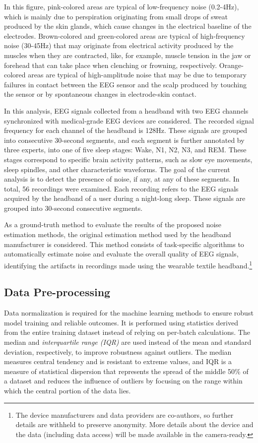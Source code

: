 \documentclass[conference]{IEEEtran}
\begin{document}
In this figure, pink-colored areas are typical of low-frequency noise (0.2-4Hz), which is mainly due to perspiration originating from small drops of sweat produced by the skin glands, which cause changes in the electrical baseline of the electrodes. Brown-colored and green-colored areas are typical of high-frequency noise (30-45Hz) that may originate from electrical activity produced by the muscles when they are contracted, like, for example, muscle tension in the jaw or forehead that can take place when clenching or frowning, respectively. Orange-colored areas are typical of high-amplitude noise that may be due to temporary failures in contact between the EEG sensor and the scalp produced by touching the sensor or by spontaneous changes in electrode-skin contact.

In this analysis, EEG signals collected from a headband with two EEG channels synchronized with medical-grade EEG devices are considered. The recorded signal frequency for each channel of the headband is 128Hz. These signals are grouped into consecutive 30-second segments, and each segment is further annotated by three experts, into one of five sleep stages: Wake, N1, N2, N3, and REM. These stages correspond to specific brain activity patterns, such as slow eye movements, sleep spindles, and other characteristic waveforms. The goal of the current analysis is to detect the presence of noise, if any, at any of these segments. In total, 56 recordings were examined. Each recording refers to the EEG signals acquired by the headband of a user during a night-long sleep. These signals are grouped into 30-second consecutive segments.

As a ground-truth method to evaluate the results of the proposed noise
estimation methods, the original estimation method used by the
headband manufacturer is considered. This method consists of
task-specific algorithms to automatically estimate noise and evaluate
the overall quality of EEG signals, identifying the artifacts in
recordings made using the wearable textile headband.\footnote{The
  device manufacturers and data providers are co-authors, so further
  details are withheld to preserve anonymity. More details about the
  device and the data (including data access) will be made available in
  the camera-ready.}


\subsection{Data Pre-processing}

Data normalization is required for the machine learning methods to
ensure robust model training and reliable outcomes. It is performed
using statistics derived from the entire training dataset instead of
relying on per-batch calculations. The median and
\emph{interquartile range (IQR)} are used instead of the mean and
standard deviation, respectively, to improve robustness against
outliers. The median measures central tendency and is resistant to
extreme values, and IQR is a measure of statistical dispersion that
represents the spread of the middle 50\% of a dataset and reduces the
influence of outliers by focusing on the range within which the
central portion of the data lies.
\end{document}
